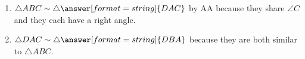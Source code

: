 \documentclass[nooutcomes]{ximera}
\begin{document}
\begin{problem}
\begin{enumerate}
\item $\triangle ABC\sim \triangle \answer[format=string]{DAC}$ by AA because they share $\angle C$ and they each have a right angle. 

\item $\triangle DAC\sim \triangle \answer[format=string]{DBA}$ because they are both similar to
$\triangle ABC$.
\end{enumerate}
\end{problem}
\end{document}
